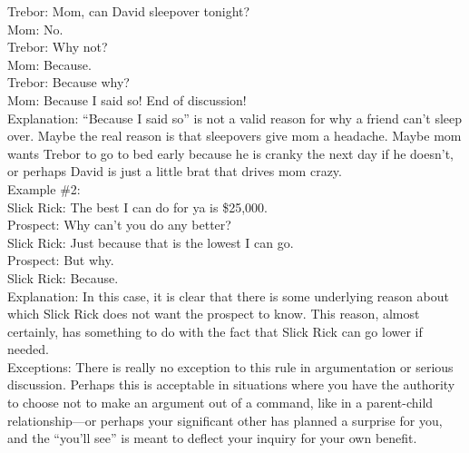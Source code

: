 \documentclass[a4paper,12pt,single,pdftex]{scrbook}
\begin{document}
    
      Trebor: Mom, can David sleepover tonight?
    \\

    
      Mom: No.
    \\

    
      Trebor:  Why not?
    \\

    
      Mom: Because.
    \\

    
      Trebor: Because why?
    \\

    
      Mom: Because I said so!  End of discussion!
    \\

    
      Explanation: “Because I said so” is not a valid reason for why a friend can’t sleep over.  Maybe the real reason is that sleepovers give mom a headache.  Maybe mom wants Trebor to go to bed early because he is cranky the next day if he doesn’t, or perhaps David is just a little brat that drives mom crazy.
    \\

    
      Example \#2:
    \\

    
      Slick Rick: The best I can do for ya is \$25,000.
    \\

    
      Prospect: Why can’t you do any better?
    \\

    
      Slick Rick: Just because that is the lowest I can go.
    \\

    
      Prospect: But why.
    \\

    
      Slick Rick: Because.
    \\

    
      Explanation: In this case, it is clear that there is some underlying reason about which Slick Rick does not want the prospect to know.  This reason, almost certainly, has something to do with the fact that Slick Rick can go lower if needed.
    \\

    
      Exceptions: There is really no exception to this rule in argumentation or serious discussion.  Perhaps this is acceptable in situations where you have the authority to choose not to make an argument out of a command, like in a parent-child relationship—or perhaps your significant other has planned a surprise for you, and the “you’ll see” is meant to deflect your inquiry for your own benefit.
    \\
\end{document}
